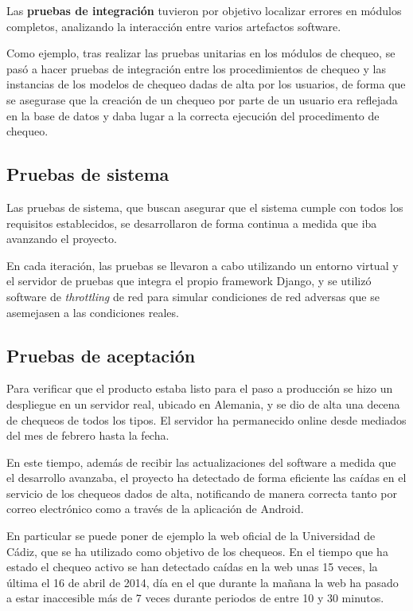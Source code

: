 Las \textbf{pruebas de integración} tuvieron por objetivo localizar errores en
módulos completos, analizando la interacción entre varios artefactos software.

Como ejemplo, tras realizar las pruebas unitarias en los módulos de chequeo, se
pasó a hacer pruebas de integración entre los procedimientos de chequeo y las
instancias de los modelos de chequeo dadas de alta por los usuarios, de forma
que se asegurase que la creación de un chequeo por parte de un usuario era
reflejada en la base de datos y daba lugar a la correcta ejecución del
procedimento de chequeo.

\subsection{Pruebas de sistema}

Las pruebas de sistema, que buscan asegurar que el sistema cumple con todos los
requisitos establecidos, se desarrollaron de forma continua a medida que iba
avanzando el proyecto. 

En cada iteración, las pruebas se llevaron a cabo utilizando un entorno virtual
y el servidor de pruebas que integra el propio framework Django, y se utilizó
software de \textit{throttling} de red para simular condiciones de red adversas
que se asemejasen a las condiciones reales.

\subsection{Pruebas de aceptación}

Para verificar que el producto estaba listo para el paso a producción se hizo un
despliegue en un servidor real, ubicado en Alemania, y se dio de alta una decena
de chequeos de todos los tipos. El servidor ha permanecido online desde mediados
del mes de febrero hasta la fecha.

En este tiempo, además de recibir las actualizaciones del software a medida que
el desarrollo avanzaba, el proyecto ha detectado de forma eficiente las caídas
en el servicio de los chequeos dados de alta, notificando de manera correcta
tanto por correo electrónico como a través de la aplicación de Android.

En particular se puede poner de ejemplo la web oficial de la Universidad de
Cádiz, que se ha utilizado como objetivo de los chequeos. En el tiempo que ha
estado el chequeo activo se han detectado caídas en la web unas 15 veces, la
última el 16 de abril de 2014, día en el que durante la mañana la web ha pasado
a estar inaccesible más de 7 veces durante periodos de entre 10 y 30 minutos.

